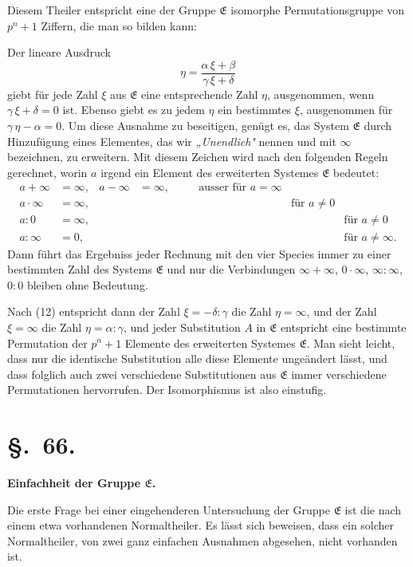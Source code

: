 \documentclass[12pt,a4paper]{article}
\newcommand{\sect}[1]{\section*{{\S.~#1.}}\addcontentsline{toc}{section}{\S.~#1}}
\begin{document}
Diesem Theiler entspricht eine der Gruppe $\mathfrak{E}$ isomorphe Permutationsgruppe von $p^{n} + 1$ Ziffern, die man so bilden kann:

Der lineare Ausdruck
\begin{equation}\label{eq:65.12}
\tag{12}
\eta = \frac{\alpha\,\xi + \beta}{\gamma\,\xi + \delta}
\end{equation}
giebt für jede Zahl $\xi$ aus $\mathfrak{E}$ eine entsprechende Zahl $\eta$, ausgenommen, wenn $\gamma\,\xi + \delta = 0$ ist. Ebenso giebt es zu jedem $\eta$ ein bestimmtes $\xi$, ausgenommen für $\gamma\,\eta - \alpha = 0$. Um diese Ausnahme zu beseitigen, genügt es, das System $\mathfrak{E}$ durch Hinzufügung eines Elementes, das wir \emph{„Unendlich"} nennen und mit $\infty$ bezeichnen, zu erweitern. Mit diesem Zeichen wird nach den folgenden Regeln gerechnet, worin $a$ irgend ein Element des erweiterten Systemes $\mathfrak{E}$ bedeutet:
\[
\begin{aligned}
a + \infty &= \infty, & a - \infty &= \infty,\quad &&\text{ausser für } a = \infty\\
a \cdot \infty &= \infty, & &&&&\text{für } a \neq 0\\
a : 0 &= \infty, &&&&&&\text{für } a \neq 0\\
a : \infty &= 0, &&&&&&\text{für } a \neq \infty.
\end{aligned}
\]
Dann führt das Ergebniss jeder Rechnung mit den vier Species immer zu einer bestimmten Zahl des Systems $\mathfrak{E}$ und nur die Verbindungen $\infty + \infty$, $0 \cdot \infty$, $\infty : \infty$, $0 : 0$ bleiben ohne Bedeutung.

Nach (12) entspricht dann der Zahl $\xi = -\delta : \gamma$ die Zahl $\eta = \infty$, und der Zahl $\xi = \infty$ die Zahl $\eta = \alpha : \gamma$, und jeder Substitution $A$ in $\mathfrak{E}$ entspricht eine bestimmte Permutation der $p^{n} + 1$ Elemente des erweiterten Systemes $\mathfrak{E}$. Man sieht leicht, dass nur die identische Substitution alle diese Elemente ungeändert lässt, und dass folglich auch zwei verschiedene Substitutionen aus $\mathfrak{E}$ immer verschiedene Permutationen hervorrufen. Der Isomorphismus ist also einstufig.

\newpage
\sect{66}
\begin{center}
\textbf{Einfachheit der Gruppe $\mathfrak{E}$.}
\end{center}
\label{sec:66}

Die erste Frage bei einer eingehenderen Untersuchung der Gruppe $\mathfrak{E}$ ist die nach einem etwa vorhandenen Normaltheiler. Es lässt sich beweisen, dass ein solcher Normaltheiler, von zwei ganz einfachen Ausnahmen abgesehen, nicht vorhanden ist.
\end{document}

